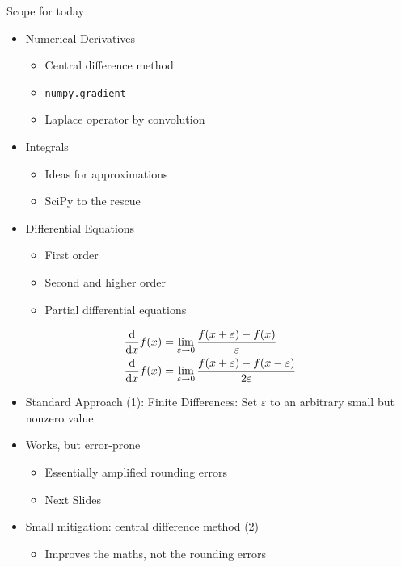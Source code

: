 \begin{frame}{Scope for today}
%
\begin{itemize}
\item Numerical Derivatives
	\begin{itemize}
	\item Central difference method
	\item \texttt{numpy.gradient}
	\item Laplace operator by convolution
	\end{itemize}
\item Integrals
	\begin{itemize}
	\item Ideas for approximations
	\item SciPy to the rescue
	\end{itemize}
\item Differential Equations
	\begin{itemize}
	\item First order
	\item Second and higher order
	\item Partial differential equations
	\end{itemize}
\end{itemize}
%
\end{frame}


\begin{frame}%
%
\begin{defbox}
\begin{align}
	\dv{x} f(x)
&=
	\lim_{\varepsilon \to 0}
		\dfrac{f(x + \varepsilon) - f(x)}{\varepsilon}
\\
	\dv{x} f(x)
&=
	\lim_{\varepsilon \to 0}
		\dfrac{f(x + \varepsilon) - f(x - \varepsilon)}{2\varepsilon}
\end{align}
\end{defbox}
%
\begin{itemize}
\item Standard Approach (1): Finite Differences: Set $\varepsilon$ to an arbitrary small but nonzero value
\item Works, but error-prone
	\begin{itemize}
	\item Essentially amplified rounding errors
	\item Next Slides
	\end{itemize}
\item Small mitigation: central difference method (2)
	\begin{itemize}
	\item Improves the maths, not the rounding errors
	\end{itemize}
\end{itemize}
%
\end{frame}


